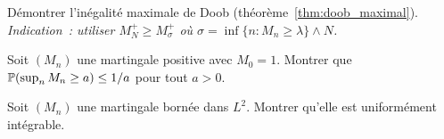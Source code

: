 \begin{exercice}
D\'emontrer l'in\'egalit\'e maximale de Doob (th\'eor\`eme~\ref{thm:doob_maximal}).
\emph{Indication~: utiliser $M_N^+ \geq M_{\sigma}^+$ o\`u
$\sigma = \inf\{n : M_n \geq \lambda\} \wedge N$.}
\end{exercice}

\begin{exercice}
Soit $(M_n)$ une martingale positive avec $M_0 = 1$. Montrer que $\mathbb{P}(\sup_n M_n \geq a) \leq 1/a$
pour tout $a > 0$.
\end{exercice}

\begin{exercice}
Soit $(M_n)$ une martingale born\'ee dans $L^2$. Montrer qu'elle est uniform\'ement
int\'egrable.
\end{exercice}
